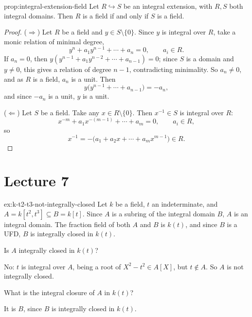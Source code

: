 \begin{proposition}{}{prop:integral-extension-field}
Let $R \hookrightarrow S$ be an integral extension, with $R,S$ both integral domains. Then $R$ is a field if and only if $S$ is a field.
\end{proposition}

\begin{proof}
($\Rightarrow$) Let $R$ be a field and $y \in S\setminus\{0\}$. Since $y$ is integral over $R$, take a monic relation of minimal degree,
\[
y^n + a_1 y^{n-1} + \cdots + a_n = 0, \qquad a_i \in R.
\]
If $a_n = 0$, then $y(y^{n-1}+a_1y^{n-2}+\cdots+a_{n-1})=0$; since $S$ is a domain and $y\neq0$, this gives a relation of degree $n-1$, contradicting minimality. So $a_n \neq 0$, and as $R$ is a field, $a_n$ is a unit. Then
\[
y\bigl(y^{n-1} + \cdots + a_{n-1}\bigr) = -a_n,
\]
and since $-a_n$ is a unit, $y$ is a unit.

($\Leftarrow$) Let $S$ be a field. Take any $x \in R \setminus\{0\}$. Then $x^{-1} \in S$ is integral over $R$:
\[
x^{-m} + a_1 x^{-(m-1)} + \cdots + a_m = 0, \qquad a_i \in R,
\]
so
\[
x^{-1} = -\bigl(a_1 + a_2 x + \cdots + a_m x^{m-1}\bigr) \in R.
\]
\end{proof}

\section{Lecture 7}

\begin{example}{}{ex:k-t2-t3-not-integrally-closed}
Let $k$ be a field, $t$ an indeterminate, and $A = k[t^2,t^3] \subseteq B = k[t]$. Since $A$ is a subring of the integral domain $B$, $A$ is an integral domain. The fraction field of both $A$ and $B$ is $k(t)$, and since $B$ is a UFD, $B$ is integrally closed in $k(t)$.
\end{example}

\begin{question}
Is $A$ integrally closed in $k(t)$?
\end{question}

No: $t$ is integral over $A$, being a root of $X^2 - t^2 \in A[X]$, but $t \notin A$. So $A$ is not integrally closed.

\begin{question}
What is the integral closure of $A$ in $k(t)$?
\end{question}

It is $B$, since $B$ is integrally closed in $k(t)$.

